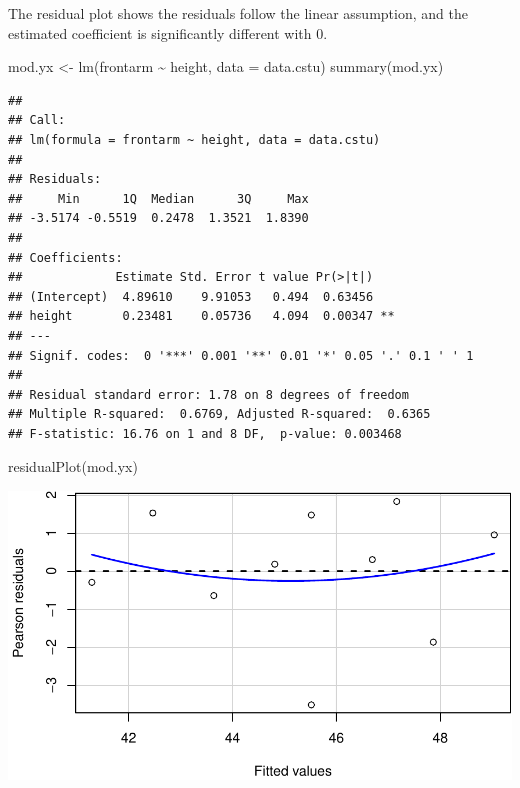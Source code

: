 \documentclass{article}
\newenvironment{Shaded}{\begin{snugshade}}{\end{snugshade}}
\newcommand{\AttributeTok}[1]{\textcolor[rgb]{0.77,0.63,0.00}{#1}}
\newcommand{\FunctionTok}[1]{\textcolor[rgb]{0.00,0.00,0.00}{#1}}
\newcommand{\NormalTok}[1]{#1}
\newcommand{\OtherTok}[1]{\textcolor[rgb]{0.56,0.35,0.01}{#1}}
\newcommand{\SpecialCharTok}[1]{\textcolor[rgb]{0.00,0.00,0.00}{#1}}
\begin{document}
The residual plot shows the residuals follow the linear assumption, and
the estimated coefficient is significantly different with 0.

\begin{Shaded}
\begin{Highlighting}[]
\NormalTok{mod.yx }\OtherTok{\textless{}{-}} \FunctionTok{lm}\NormalTok{(frontarm }\SpecialCharTok{\textasciitilde{}}\NormalTok{ height, }\AttributeTok{data =}\NormalTok{ data.cstu)}
\FunctionTok{summary}\NormalTok{(mod.yx)}
\end{Highlighting}
\end{Shaded}

\begin{verbatim}
## 
## Call:
## lm(formula = frontarm ~ height, data = data.cstu)
## 
## Residuals:
##     Min      1Q  Median      3Q     Max 
## -3.5174 -0.5519  0.2478  1.3521  1.8390 
## 
## Coefficients:
##             Estimate Std. Error t value Pr(>|t|)   
## (Intercept)  4.89610    9.91053   0.494  0.63456   
## height       0.23481    0.05736   4.094  0.00347 **
## ---
## Signif. codes:  0 '***' 0.001 '**' 0.01 '*' 0.05 '.' 0.1 ' ' 1
## 
## Residual standard error: 1.78 on 8 degrees of freedom
## Multiple R-squared:  0.6769, Adjusted R-squared:  0.6365 
## F-statistic: 16.76 on 1 and 8 DF,  p-value: 0.003468
\end{verbatim}

\begin{Shaded}
\begin{Highlighting}[]
\FunctionTok{residualPlot}\NormalTok{(mod.yx)}
\end{Highlighting}
\end{Shaded}

\includegraphics{Reference_solutions_files/figure-latex/unnamed-chunk-19-1.pdf}
\end{document}
